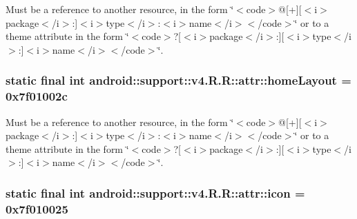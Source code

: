 Must be a reference to another resource, in the form \char`\"{}$<$code$>$@\mbox{[}+\mbox{]}\mbox{[}$<$i$>$package$<$/i$>$:\mbox{]}$<$i$>$type$<$/i$>$:$<$i$>$name$<$/i$>$$<$/code$>$\char`\"{} or to a theme attribute in the form \char`\"{}$<$code$>$?\mbox{[}$<$i$>$package$<$/i$>$:\mbox{]}\mbox{[}$<$i$>$type$<$/i$>$:\mbox{]}$<$i$>$name$<$/i$>$$<$/code$>$\char`\"{}. \hypertarget{classandroid_1_1support_1_1v4_1_1_r_1_1attr_04ee478c4e24fa943d5a987a40056909}{
\subsubsection[{homeLayout}]{\setlength{\rightskip}{0pt plus 5cm}static final int android::support::v4.R.R::attr::homeLayout = 0x7f01002c}}
\label{classandroid_1_1support_1_1v4_1_1_r_1_1attr_04ee478c4e24fa943d5a987a40056909}


Must be a reference to another resource, in the form \char`\"{}$<$code$>$@\mbox{[}+\mbox{]}\mbox{[}$<$i$>$package$<$/i$>$:\mbox{]}$<$i$>$type$<$/i$>$:$<$i$>$name$<$/i$>$$<$/code$>$\char`\"{} or to a theme attribute in the form \char`\"{}$<$code$>$?\mbox{[}$<$i$>$package$<$/i$>$:\mbox{]}\mbox{[}$<$i$>$type$<$/i$>$:\mbox{]}$<$i$>$name$<$/i$>$$<$/code$>$\char`\"{}. \hypertarget{classandroid_1_1support_1_1v4_1_1_r_1_1attr_af2e94ca2a651419be830ee2aa624bb5}{
\subsubsection[{icon}]{\setlength{\rightskip}{0pt plus 5cm}static final int android::support::v4.R.R::attr::icon = 0x7f010025}}
\label{classandroid_1_1support_1_1v4_1_1_r_1_1attr_af2e94ca2a651419be830ee2aa624bb5}


